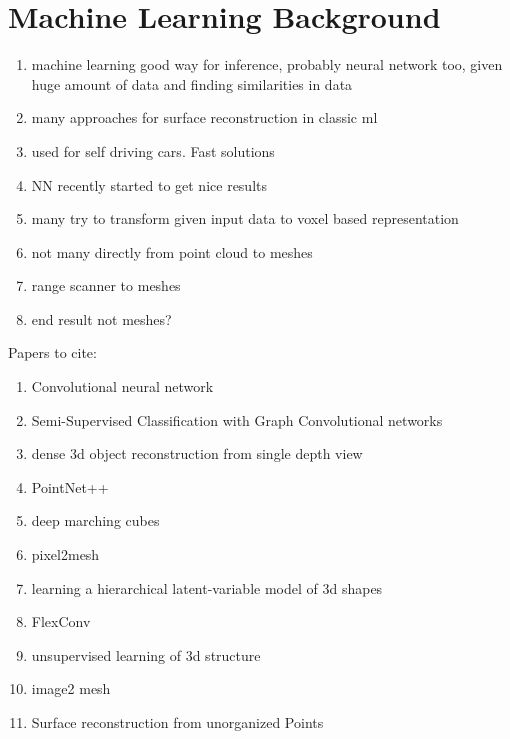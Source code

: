 \section{Machine Learning Background}
\begin{enumerate}
  \item machine learning good way for inference, probably neural network too, given huge amount of data and finding similarities in data
  \item many approaches for surface reconstruction in classic ml
  \item used for self driving cars. Fast solutions
  \item NN recently started to get nice results
  \item many try to transform given input data to voxel based representation
  \item not many directly from point cloud to meshes
  \item range scanner to meshes
  \item end result not meshes?
\end{enumerate}
Papers to cite:
\begin{enumerate}
  \item Convolutional neural network
  \item Semi-Supervised Classification with Graph Convolutional networks
  \item dense 3d object reconstruction from single depth view
  \item PointNet++
  \item deep marching cubes
  \item pixel2mesh
  \item learning a hierarchical latent-variable model of 3d shapes
  \item FlexConv
  \item unsupervised learning of 3d structure
  \item image2 mesh
  \item Surface reconstruction from unorganized Points
\end{enumerate}
